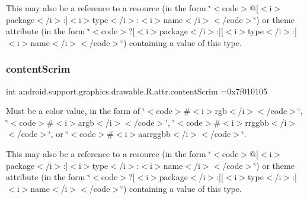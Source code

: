 This may also be a reference to a resource (in the form \char`\"{}$<$code$>$@\mbox{[}$<$i$>$package$<$/i$>$\+:\mbox{]}$<$i$>$type$<$/i$>$\+:$<$i$>$name$<$/i$>$$<$/code$>$\char`\"{}) or theme attribute (in the form \char`\"{}$<$code$>$?\mbox{[}$<$i$>$package$<$/i$>$\+:\mbox{]}\mbox{[}$<$i$>$type$<$/i$>$\+:\mbox{]}$<$i$>$name$<$/i$>$$<$/code$>$\char`\"{}) containing a value of this type. \mbox{\label{classandroid_1_1support_1_1graphics_1_1drawable_1_1R_1_1attr_a69a33d1e5464300fde6db42994636dec}} 
\subsubsection{\texorpdfstring{content\+Scrim}{contentScrim}}
{\footnotesize\ttfamily int android.\+support.\+graphics.\+drawable.\+R.\+attr.\+content\+Scrim =0x7f010105\hspace{0.3cm}{\ttfamily [static]}}

Must be a color value, in the form of \char`\"{}$<$code$>$\#$<$i$>$rgb$<$/i$>$$<$/code$>$\char`\"{}, \char`\"{}$<$code$>$\#$<$i$>$argb$<$/i$>$$<$/code$>$\char`\"{}, \char`\"{}$<$code$>$\#$<$i$>$rrggbb$<$/i$>$$<$/code$>$\char`\"{}, or \char`\"{}$<$code$>$\#$<$i$>$aarrggbb$<$/i$>$$<$/code$>$\char`\"{}. 

This may also be a reference to a resource (in the form \char`\"{}$<$code$>$@\mbox{[}$<$i$>$package$<$/i$>$\+:\mbox{]}$<$i$>$type$<$/i$>$\+:$<$i$>$name$<$/i$>$$<$/code$>$\char`\"{}) or theme attribute (in the form \char`\"{}$<$code$>$?\mbox{[}$<$i$>$package$<$/i$>$\+:\mbox{]}\mbox{[}$<$i$>$type$<$/i$>$\+:\mbox{]}$<$i$>$name$<$/i$>$$<$/code$>$\char`\"{}) containing a value of this type. \mbox{\label{classandroid_1_1support_1_1graphics_1_1drawable_1_1R_1_1attr_aac5d5a0aff0c33aa3399c429eaaac6a0}} 
